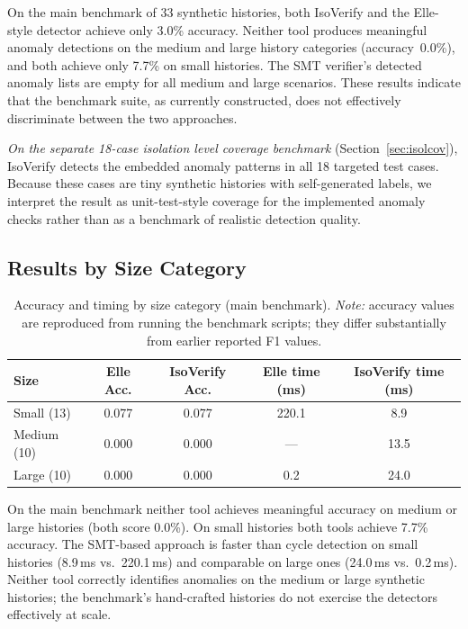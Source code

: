 \documentclass[11pt]{article}
\begin{document}
On the main benchmark of 33 synthetic histories, both IsoVerify and the
Elle-style detector achieve only 3.0\% accuracy.  Neither tool produces
meaningful anomaly detections on the medium and large history categories
(accuracy~0.0\%), and both achieve only 7.7\% on small histories.  The
SMT verifier's detected anomaly lists are empty for all medium and large
scenarios.  These results indicate that the benchmark suite, as currently
constructed, does not effectively discriminate between the two approaches.

\emph{On the separate 18-case isolation level coverage benchmark}
(Section~\ref{sec:isolcov}), IsoVerify detects the embedded anomaly patterns in
all 18 targeted test cases.  Because these cases are tiny synthetic histories
with self-generated labels, we interpret the result as unit-test-style coverage
for the implemented anomaly checks rather than as a benchmark of realistic
detection quality.

\subsection{Results by Size Category}

\begin{table}[t]
\centering
\caption{Accuracy and timing by size category (main benchmark).
  \emph{Note:} accuracy values are reproduced from running the benchmark
  scripts; they differ substantially from earlier reported F1 values.}
\label{tab:bysize}
\begin{tabular}{lcccc}
\toprule
\textbf{Size} & \textbf{Elle Acc.} & \textbf{IsoVerify Acc.} & \textbf{Elle time (ms)} & \textbf{IsoVerify time (ms)} \\
\midrule
Small (13)   & 0.077 & 0.077 & 220.1  & 8.9 \\
Medium (10)  & 0.000 & 0.000 &   ---  & 13.5 \\
Large (10)   & 0.000 & 0.000 &   0.2  & 24.0 \\
\bottomrule
\end{tabular}
\end{table}

On the main benchmark neither tool achieves meaningful accuracy on medium or
large histories (both score 0.0\%).  On small histories both tools achieve
7.7\% accuracy.  The SMT-based approach is faster than cycle detection on
small histories (8.9\,ms vs.\ 220.1\,ms) and comparable on large ones
(24.0\,ms vs.\ 0.2\,ms).  Neither tool correctly identifies anomalies on
the medium or large synthetic histories; the benchmark's hand-crafted
histories do not exercise the detectors effectively at scale.
\end{document}
